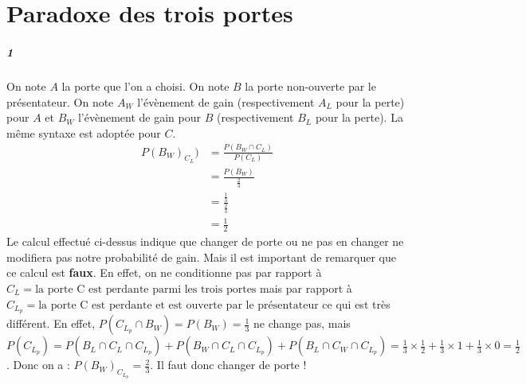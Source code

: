 \documentclass[10pt,a4paper]{article}
\begin{document}
\section{Paradoxe des trois portes}
\subparagraph{1}On note $A$ la porte que l'on a choisi. On note $B$ la porte non-ouverte par le présentateur. On note $A_W$ l'évènement de gain (respectivement $A_L$ pour la perte) pour $A$ et $B_W$ l'évènement de gain pour $B$ (respectivement $B_L$ pour la perte). La même syntaxe est adoptée pour $C$.
\begin{equation}
\begin{aligned}
P(B_W)_{C_L}) &= \frac{P(B_W \cap C_L)}{P(C_L)} \\
&= \frac{P(B_W)}{\frac{2}{3}} \\
&= \frac{\frac{1}{3}}{\frac{2}{3}} \\
&= \frac{1}{2}
\end{aligned}
\end{equation}
Le calcul effectué ci-dessus indique que changer de porte ou ne pas en changer ne modifiera pas notre probabilité de gain. Mais il est important de remarquer que ce calcul est \textbf{faux}. En effet, on ne conditionne pas par rapport à $C_L = \text{la porte C est perdante parmi les trois portes}$ mais par rapport à $C_{L_p} = \text{la porte C est perdante et est ouverte par le présentateur}$ ce qui est très différent. En effet, $P(C_{L_p} \cap B_W) = P(B_W) = \frac{1}{3}$ ne change pas, mais $P(C_{L_p})=P(B_L \cap C_L \cap C_{L_p}) + P(B_W \cap C_L \cap C_{L_p}) + P(B_L \cap C_W \cap C_{L_p}) = \frac{1}{3} \times \frac{1}{2} + \frac{1}{3} \times 1 + \frac{1}{3} \times 0 = \frac{1}{2}$. Donc on a : $P(B_W)_{C_{L_p}}=\frac{2}{3}$. Il faut donc changer de porte !
\end{document}
